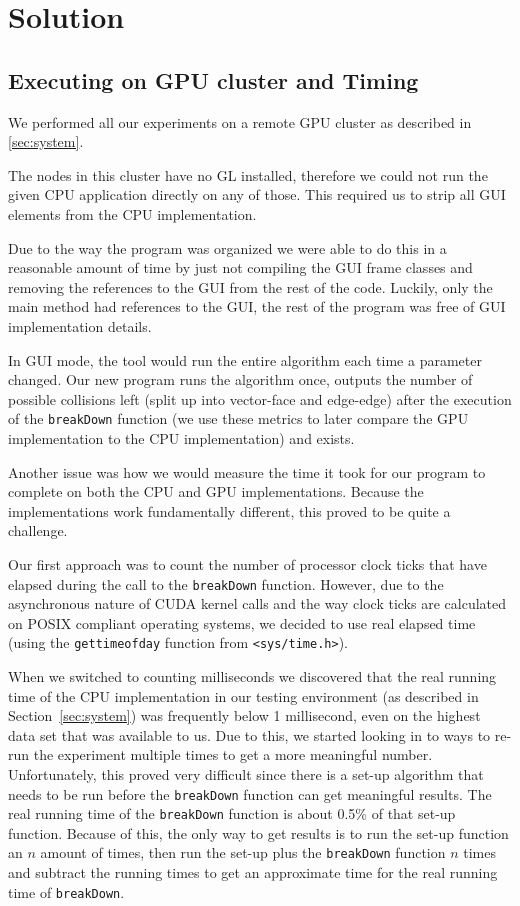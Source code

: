 \section{Solution}
\subsection{Executing on GPU cluster and Timing}
We performed all our experiments on a remote GPU cluster as described in \ref{sec:system}.

The nodes in this cluster have no GL installed, therefore we could not run the given CPU application directly on any of those.
This required us to strip all GUI elements from the CPU implementation.

Due to the way the program was organized we were able to do this in a reasonable amount of time by just not compiling the GUI frame classes and removing the references to the GUI from the rest of the code.
Luckily, only the main method had references to the GUI, the rest of the program was free of GUI implementation details.

In GUI mode, the tool would run the entire algorithm each time a parameter changed.
Our new program runs the algorithm once, outputs the number of possible collisions left (split up into vector-face and edge-edge) after the execution of the \texttt{breakDown} function (we use these metrics to later compare the GPU implementation to the CPU implementation) and exists.

Another issue was how we would measure the time it took for our program to complete on both the CPU and GPU implementations.
Because the implementations work fundamentally different, this proved to be quite a challenge.

Our first approach was to count the number of processor clock ticks that have elapsed during the call to the \texttt{breakDown} function.
However, due to the asynchronous nature of CUDA kernel calls and the way clock ticks are calculated on POSIX compliant operating systems, we decided to use real elapsed time (using the \texttt{gettimeofday} function from \texttt{<sys/time.h>}).

When we switched to counting milliseconds we discovered that the real running time of the CPU implementation in our testing environment (as described in Section~\ref{sec:system}) was frequently below 1 millisecond, even on the highest data set that was available to us.
Due to this, we started looking in to ways to re-run the experiment multiple times to get a more meaningful number.
Unfortunately, this proved very difficult since there is a set-up algorithm that needs to be run before the \texttt{breakDown} function can get meaningful results.
The real running time of the \texttt{breakDown} function is about 0.5\% of that set-up function.
Because of this, the only way to get results is to run the set-up function an $n$ amount of times, then run the set-up plus the \texttt{breakDown} function $n$ times and subtract the running times to get an approximate time for the real running time of \texttt{breakDown}.

